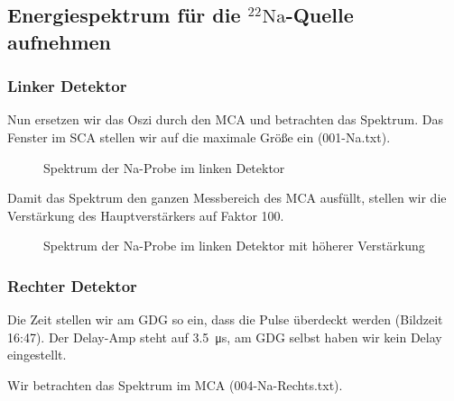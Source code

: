 \subsection{Energiespektrum für die ${}^{22}\text{Na}$-Quelle aufnehmen}

\subsubsection{Linker Detektor}

Nun ersetzen wir das Oszi durch den MCA und betrachten das Spektrum. Das
Fenster im SCA stellen wir auf die maximale Größe ein (001-Na.txt).

\begin{figure}[htbp]
    \centering
    \label{mca:001}
    \caption{Spektrum der Na-Probe im linken Detektor}
\end{figure}

Damit das Spektrum den ganzen Messbereich des MCA ausfüllt, stellen wir die
Verstärkung des Hauptverstärkers auf Faktor 100.

\begin{figure}[htbp]
    \centering
    \label{mca:003}
    \caption{Spektrum der Na-Probe im linken Detektor mit höherer Verstärkung}
\end{figure}

\subsubsection{Rechter Detektor}

Die Zeit stellen wir am GDG so ein, dass die Pulse überdeckt werden (Bildzeit
16:47). Der Delay-Amp steht auf \SI{3.5}{\micro\second}, am GDG selbst haben
wir kein Delay eingestellt.

Wir betrachten das Spektrum im MCA (004-Na-Rechts.txt).

